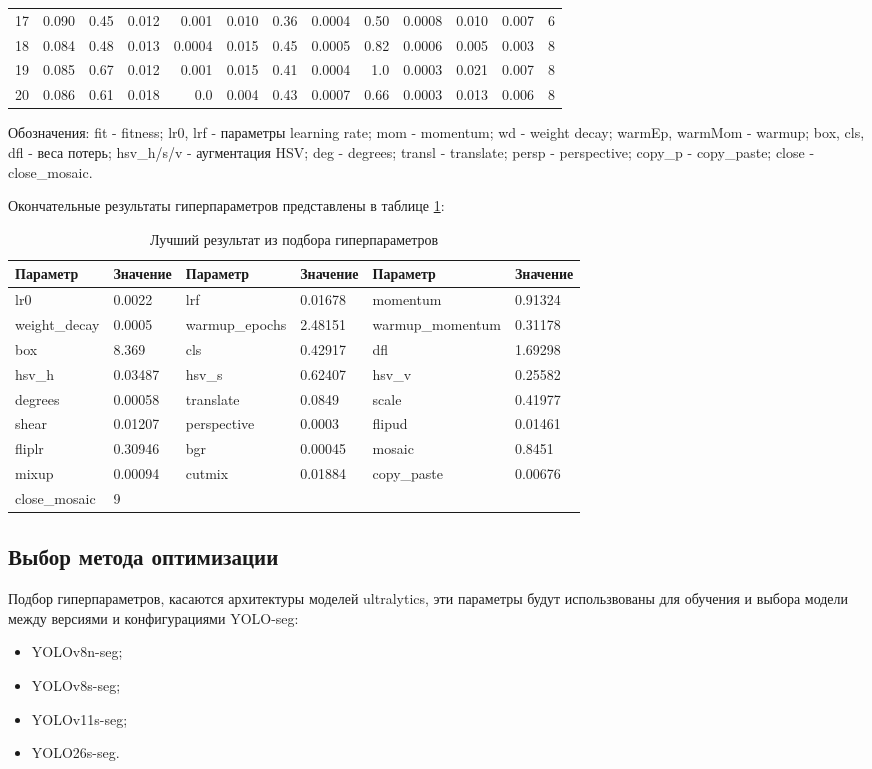 \documentclass[areasetadvanced]{scrartcl}
\begin{document}
\begin{table}[H]
{\begin{tabular}{r|r|r|r|r|r|r|r|r|r|r|r|r|}
17 & 0.090 & 0.45 & 0.012 & 0.001 & 0.010 & 0.36 & 0.0004 & 0.50 & 0.0008 & 0.010 & 0.007 & 6 \\
18 & 0.084 & 0.48 & 0.013 & 0.0004 & 0.015 & 0.45 & 0.0005 & 0.82 & 0.0006 & 0.005 & 0.003 & 8 \\
19 & 0.085 & 0.67 & 0.012 & 0.001 & 0.015 & 0.41 & 0.0004 & 1.0 & 0.0003 & 0.021 & 0.007 & 8 \\
20 & 0.086 & 0.61 & 0.018 & 0.0 & 0.004 & 0.43 & 0.0007 & 0.66 & 0.0003 & 0.013 & 0.006 & 8 \\
\hline
\end{tabular}%
}
\end{table}

\noindent Обозначения: fit - fitness; lr0, lrf - параметры learning rate; mom - momentum; wd - weight decay; warmEp, warmMom - warmup; box, cls, dfl - веса потерь; hsv\_h/s/v - аугментация HSV; deg - degrees; transl - translate; persp - perspective; copy\_p - copy\_paste; close - close\_mosaic.

Окончательные результаты гиперпараметров представлены в таблице \ref{tab:finalHyper}:

\begin{table}[H]
\centering
\caption{Лучший результат из подбора гиперпараметров}
\label{tab:finalHyper}
\footnotesize
\begin{tabular}{|ll|ll|ll|}
\hline
Параметр & Значение & Параметр & Значение & Параметр & Значение \\
\hline
lr0 & 0.0022 & lrf & 0.01678 & momentum & 0.91324 \\
weight\_decay & 0.0005 & warmup\_epochs & 2.48151 & warmup\_momentum & 0.31178 \\
box & 8.369 & cls & 0.42917 & dfl & 1.69298 \\
hsv\_h & 0.03487 & hsv\_s & 0.62407 & hsv\_v & 0.25582 \\
degrees & 0.00058 & translate & 0.0849 & scale & 0.41977 \\
shear & 0.01207 & perspective & 0.0003 & flipud & 0.01461 \\
fliplr & 0.30946 & bgr & 0.00045 & mosaic & 0.8451 \\
mixup & 0.00094 & cutmix & 0.01884 & copy\_paste & 0.00676 \\
close\_mosaic & 9 & & & & \\
\hline
\end{tabular}
\end{table}

\subsection{Выбор метода оптимизации}
Подбор гиперпараметров, касаются архитектуры моделей ultralytics, эти параметры будут использвованы для обучения и выбора модели между версиями и конфигурациями YOLO-seg:
\begin{itemize}
    \item YOLOv8n-seg;
    \item YOLOv8s-seg;
    \item YOLOv11s-seg;
    \item YOLO26s-seg.
\end{itemize}
\end{document}
